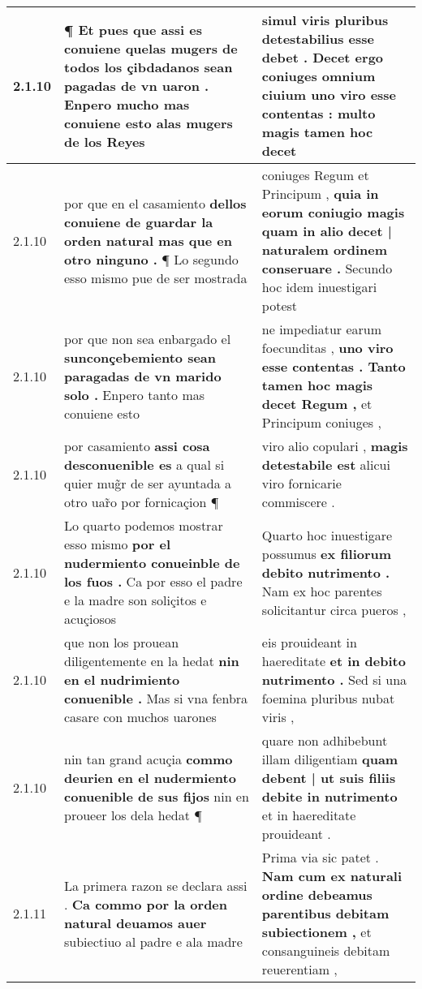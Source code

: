 \begin{tabular}{|p{1cm}|p{6.5cm}|p{6.5cm}|}
2.1.10 & ¶ Et pues que assi es conuiene \textbf{ quelas mugers de todos los çibdadanos sean pagadas de vn uaron . } Enpero mucho mas conuiene esto alas mugers de los Reyes & simul viris pluribus detestabilius esse debet . \textbf{ Decet ergo coniuges omnium ciuium uno viro esse contentas : } multo magis tamen hoc decet \\\hline
2.1.10 & por que en el casamiento \textbf{ dellos conuiene de guardar la orden natural mas que en otro ninguno . } ¶ Lo segundo esso mismo pue de ser mostrada & coniuges Regum et Principum , \textbf{ quia in eorum coniugio magis quam in alio decet | naturalem ordinem conseruare . } Secundo hoc idem inuestigari potest \\\hline
2.1.10 & por que non sea enbargado el \textbf{ sunconçebemiento sean paragadas de vn marido solo . } Enpero tanto mas conuiene esto & ne impediatur earum foecunditas , \textbf{ uno viro esse contentas . Tanto tamen hoc magis decet Regum , } et Principum coniuges , \\\hline
2.1.10 & por casamiento \textbf{ assi cosa desconuenible es } a qual si quier mug̃r de ser ayuntada a otro uar̃o por fornicaçion ¶ & viro alio copulari , \textbf{ magis detestabile est } alicui viro fornicarie commiscere . \\\hline
2.1.10 & Lo quarto podemos mostrar esso mismo \textbf{ por el nudermiento conueinble de los fuos . } Ca por esso el padre e la madre son soliçitos e acuçiosos & Quarto hoc inuestigare possumus \textbf{ ex filiorum debito nutrimento . } Nam ex hoc parentes solicitantur circa pueros , \\\hline
2.1.10 & que non los prouean diligentemente en la hedat \textbf{ nin en el nudrimiento conuenible . } Mas si vna fenbra casare con muchos uarones & eis prouideant in haereditate \textbf{ et in debito nutrimento . } Sed si una foemina pluribus nubat viris , \\\hline
2.1.10 & nin tan grand acuçia \textbf{ commo deurien en el nudermiento conuenible de sus fijos } nin en proueer los dela hedat ¶ & quare non adhibebunt illam diligentiam \textbf{ quam debent | ut suis filiis debite in nutrimento } et in haereditate prouideant . \\\hline
2.1.11 & La primera razon se declara assi . \textbf{ Ca commo por la orden natural deuamos auer } subiectiuo al padre e ala madre & Prima via sic patet . \textbf{ Nam cum ex naturali ordine debeamus parentibus debitam subiectionem , } et consanguineis debitam reuerentiam , \\\hline

\end{tabular}
